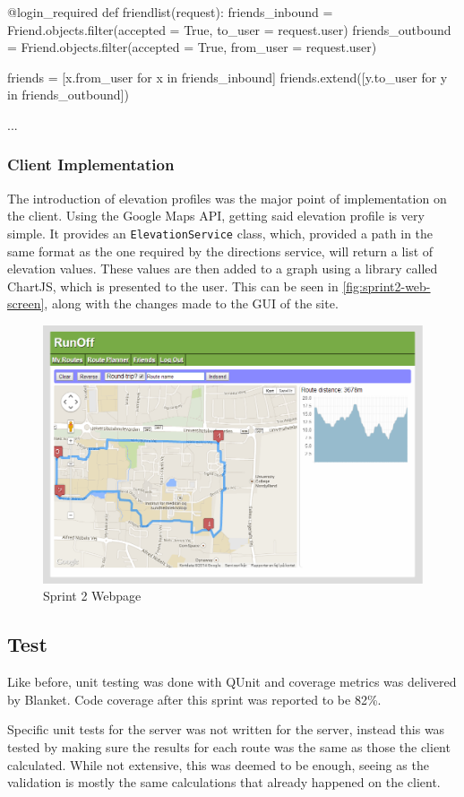 \begin{code}[label={lst:sprint2-get-friends}, caption={'Friend List' function}, language={Python}]
@login_required
def friendlist(request):
	friends_inbound = Friend.objects.filter(accepted = True, to_user = request.user)
	friends_outbound = Friend.objects.filter(accepted = True, from_user = request.user)
	
	friends = [x.from_user for x in friends_inbound]
	friends.extend([y.to_user for y in friends_outbound])
	
	...
\end{code}

\subsubsection{Client Implementation}

The introduction of elevation profiles was the major point of implementation on the client. Using the Google Maps \ac{API}, getting said elevation profile is very simple. It provides an \texttt{ElevationService} class, which, provided a path in the same format as the one required by the directions service, will return a list of elevation values. These values are then added to a graph using a library called ChartJS\cite{chartjs}, which is presented to the user. This can be seen in \autoref{fig:sprint2-web-screen}, along with the changes made to the \ac{GUI} of the site.

\begin{figure}[ht]
 \centering
 \includegraphics[width=\textwidth]{img/webplanner2.png}
 \caption{Sprint 2 Webpage}
 \label{fig:sprint2-web-screen}
\end{figure}

\subsection{Test}

Like before, unit testing was done with QUnit and coverage metrics was delivered by Blanket. Code coverage after this sprint was reported to be 82\%.

Specific unit tests for the server was not written for the server, instead this was tested by making sure the results for each route was the same as those the client calculated. While not extensive, this was deemed to be enough, seeing as the validation is mostly the same calculations that already happened on the client.
